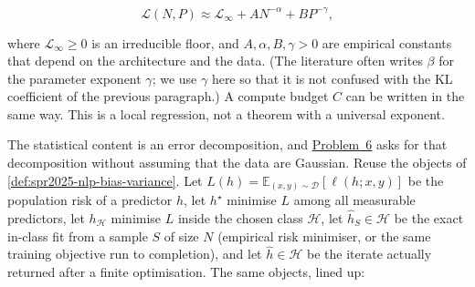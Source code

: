 \documentclass[11pt,a4paper]{article}
\newcommand{\jump}[2]{\hyperref[#1]{#2}}
\theoremstyle{definition}
\begin{document}
\[
\mathcal{L}(N,P)
\approx\mathcal{L}_\infty+A N^{-\alpha}+B P^{-\gamma},
\]

where \(\mathcal{L}_\infty\geq 0\) is an irreducible floor, and \(A,\alpha,B,\gamma>0\) are empirical constants that depend on the architecture and the data. (The literature often writes \(\beta\) for the parameter exponent \(\gamma\); we use \(\gamma\) here so that it is not confused with the KL coefficient of the previous paragraph.) A compute budget \(C\) can be written in the same way. This is a local regression, not a theorem with a universal exponent.

The statistical content is an error decomposition, and \jump{prob:spr2025-nlp-6}{Problem~6} asks for that decomposition without assuming that the data are Gaussian. Reuse the objects of \cref{def:spr2025-nlp-bias-variance}. Let \(L(h)=\mathbb{E}_{(x,y)\sim\mathcal{D}}[\ell(h;x,y)]\) be the population risk of a predictor \(h\), let \(h^\star\) minimise \(L\) among all measurable predictors, let \(h_{\mathcal{H}}\) minimise \(L\) inside the chosen class \(\mathcal{H}\), let \(\widehat h_S\in\mathcal{H}\) be the exact in-class fit from a sample \(S\) of size \(N\) (empirical risk minimiser, or the same training objective run to completion), and let \(\widehat h\in\mathcal{H}\) be the iterate actually returned after a finite optimisation. The same objects, lined up:
\end{document}
